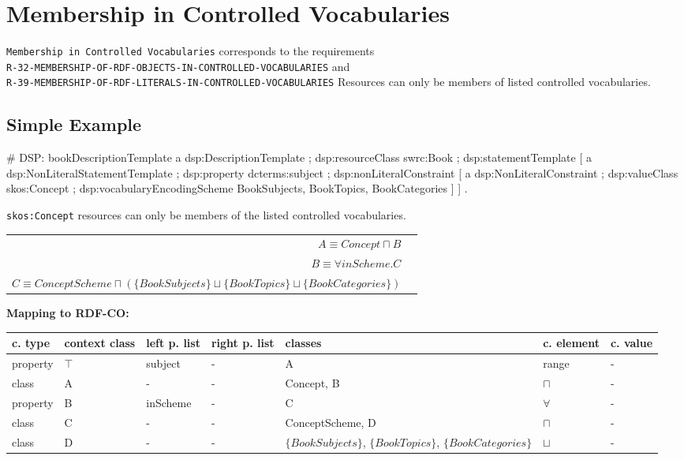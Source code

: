 \documentclass{llncs}
\newcommand{\ms}[1]{\texttt{#1}}
\newenvironment{gcotable}{
  \scriptsize
  \sffamily
  \vspace{0cm}
	\begin{center}
	\textbf{\vspace{0.4cm}Mapping to RDF-CO:} \\
  \begin{tabular}{l|l|l|l|l|l|l}
	\hline
  \textbf{c. type} & \textbf{context class} & \textbf{left p. list} & \textbf{right p. list} & \textbf{classes} & \textbf{c. element} & \textbf{c. value} \\
  \hline

}{
  \hline
  \end{tabular}
	\end{center}
}
\newenvironment{DL}{
  \vspace{0cm}
	\begin{center}
  \begin{tabular}{r l}

}{
  \end{tabular}
	\end{center}
}
\newcommand{\er}[1]{\todo[size=\small, color=red!40]{\textbf{Erman:} #1}}
\begin{document}
\section{Membership in Controlled Vocabularies}

\ms{Membership in Controlled Vocabularies} corresponds to the requirements \\
\ms{R-32-MEMBERSHIP-OF-RDF-OBJECTS-IN-CONTROLLED-VOCABULARIES} and \\
\ms{R-39-MEMBERSHIP-OF-RDF-LITERALS-IN-CONTROLLED-VOCABULARIES}
Resources can only be members of listed controlled vocabularies.

\subsection{Simple Example}

\begin{ex}
# DSP:
bookDescriptionTemplate 
    a dsp:DescriptionTemplate ;
    dsp:resourceClass swrc:Book ; 
    dsp:statementTemplate [
        a dsp:NonLiteralStatementTemplate ;
        dsp:property dcterms:subject ; 
        dsp:nonLiteralConstraint [ 
            a dsp:NonLiteralConstraint ;
            dsp:valueClass skos:Concept ; 
            dsp:vocabularyEncodingScheme BookSubjects, BookTopics, BookCategories ] ] .
\end{ex}

\ms{skos:Concept} resources can only be members of the listed controlled vocabularies.

\begin{DL}
$A \equiv Concept \sqcap B$ \\
$B \equiv \forall inScheme . C$ \\
$C \equiv ConceptScheme \sqcap ( \{BookSubjects\} \sqcup \{BookTopics\} \sqcup \{BookCategories\} )$
\end{DL}

\begin{gcotable}
property & $\top$ & subject & - & A & range & - \\
class & A & - & - & Concept, B & $\sqcap$ & - \\
property & B & inScheme & - & C & $\forall$ & - \\
class & C & - & - & ConceptScheme, D & $\sqcap$ & - \\
class & D & - & - & $\{BookSubjects\}$, $\{BookTopics\}$, $\{BookCategories\}$ & $\sqcup$ & - \\
\end{gcotable}
\end{document}
